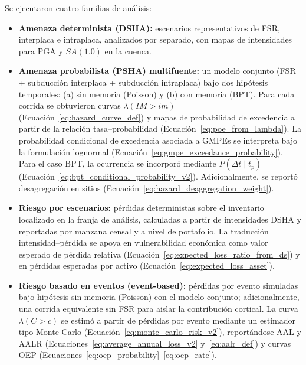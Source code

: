 Se ejecutaron cuatro familias de análisis:
\begin{itemize}
    \item \textbf{Amenaza determinista (DSHA):} escenarios representativos de FSR, interplaca e intraplaca, analizados por separado, con mapas de intensidades para PGA y $SA(1.0)$ en la cuenca.

    \item \textbf{Amenaza probabilista (PSHA) multifuente:} un modelo conjunto (FSR + subducción interplaca + subducción intraplaca) bajo dos hipótesis temporales: (a) sin memoria (Poisson) y (b) con memoria (BPT). Para cada corrida se obtuvieron curvas $\lambda(IM>im)$ (Ecuación~\ref{eq:hazard_curve_def}) y mapas de probabilidad de excedencia a partir de la relación tasa--probabilidad (Ecuación~\ref{eq:poe_from_lambda}). La probabilidad condicional de excedencia asociada a GMPEs se interpreta bajo la formulación lognormal (Ecuación~\ref{eq:gmpe_exceedance_probability}). Para el caso BPT, la ocurrencia se incorporó mediante $P(\Delta t\mid t_p)$ (Ecuación~\ref{eq:bpt_conditional_probability_v2}). Adicionalmente, se reportó desagregación en sitios (Ecuación~\ref{eq:hazard_deaggregation_weight}).

    \item \textbf{Riesgo por escenarios:} pérdidas deterministas sobre el inventario localizado en la franja de análisis, calculadas a partir de intensidades DSHA y reportadas por manzana censal y a nivel de portafolio. La traducción intensidad--pérdida se apoya en vulnerabilidad económica como valor esperado de pérdida relativa (Ecuación~\ref{eq:expected_loss_ratio_from_ds}) y en pérdidas esperadas por activo (Ecuación~\ref{eq:expected_loss_asset}).

    \item \textbf{Riesgo basado en eventos (event-based):} pérdidas por evento simuladas bajo hipótesis sin memoria (Poisson) con el modelo conjunto; adicionalmente, una corrida equivalente sin FSR para aislar la contribución cortical. La curva $\lambda(C>c)$ se estimó a partir de pérdidas por evento mediante un estimador tipo Monte Carlo (Ecuación~\ref{eq:monte_carlo_risk_v2}), reportándose AAL y AALR (Ecuaciones~\ref{eq:average_annual_loss_v2} y~\ref{eq:aalr_def}) y curvas OEP (Ecuaciones~\ref{eq:oep_probability}--\ref{eq:oep_rate}).
\end{itemize}

